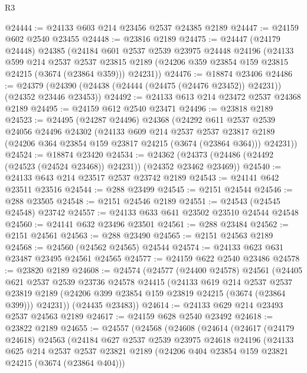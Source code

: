 \begin{lexlean}{R3}
\begin{coremodule}
@24444 := @24133 @603 @214 @23456 @2537 @24385 @2189
@24447 := @24159 @602 @2540 @23455
@24448 := @23816 @2189
@24475 := @24447
    (@24179 @24448)
    @24385
    (@24184
      @601
      @2537
      @2539
      @23975
      @24448
      @24196
      (@24133
        @599
        @214
        @2537
        @2537
        @23815
        @2189
        (@24206 @359 @23854 @159 @23815 @24215 (@3674 (@23864 @359)))
        @24231))
@24476 := @18874 @23406
@24486 := @24379 (@24390 (@24438 (@24444 (@24475 (@24476 @23452)) @24231)) (@24352 @23446 @23453))
@24492 := @24133 @613 @214 @23472 @2537 @24368 @2189
@24495 := @24159 @612 @2540 @23471
@24496 := @23818 @2189
@24523 := @24495
    (@24287 @24496)
    @24368
    (@24292
      @611
      @2537
      @2539
      @24056
      @24496
      @24302
      (@24133
        @609
        @214
        @2537
        @2537
        @23817
        @2189
        (@24206 @364 @23854 @159 @23817 @24215 (@3674 (@23864 @364)))
        @24231))
@24524 := @18874 @23420
@24534 := @24362 (@24373 (@24486 (@24492 (@24523 (@24524 @23468)) @24231)) (@24352 @23462 @23469))
@24540 := @24133 @643 @214 @23517 @2537 @23742 @2189
@24543 := @24141 @642 @23511 @23516
@24544 := @288 @23499
@24545 := @2151 @24544
@24546 := @288 @23505
@24548 := @2151 @24546 @2189
@24551 := @24543 (@24545 @24548) @23742
@24557 := @24133 @633 @641 @23502 @23510 @24544 @24548
@24560 := @24141 @632 @23496 @23501
@24561 := @288 @23484
@24562 := @2151 @24561
@24563 := @288 @23490
@24565 := @2151 @24563 @2189
@24568 := @24560 (@24562 @24565) @24544
@24574 := @24133 @623 @631 @23487 @23495 @24561 @24565
@24577 := @24159 @622 @2540 @23486
@24578 := @23820 @2189
@24608 := @24574
    (@24577
      (@24400 @24578)
      @24561
      (@24405
        @621
        @2537
        @2539
        @23736
        @24578
        @24415
        (@24133
          @619
          @214
          @2537
          @2537
          @23819
          @2189
          (@24206 @399 @23854 @159 @23819 @24215 (@3674 (@23864 @399)))
          @24231))
      (@24435 @23483))
@24614 := @24133 @629 @214 @23493 @2537 @24563 @2189
@24617 := @24159 @628 @2540 @23492
@24618 := @23822 @2189
@24655 := @24557
    (@24568
      (@24608
        (@24614
          (@24617
            (@24179 @24618)
            @24563
            (@24184
              @627
              @2537
              @2539
              @23975
              @24618
              @24196
              (@24133
                @625
                @214
                @2537
                @2537
                @23821
                @2189
                (@24206 @404 @23854 @159 @23821 @24215 (@3674 (@23864 @404)))

\end{coremodule}
\end{lexlean}
